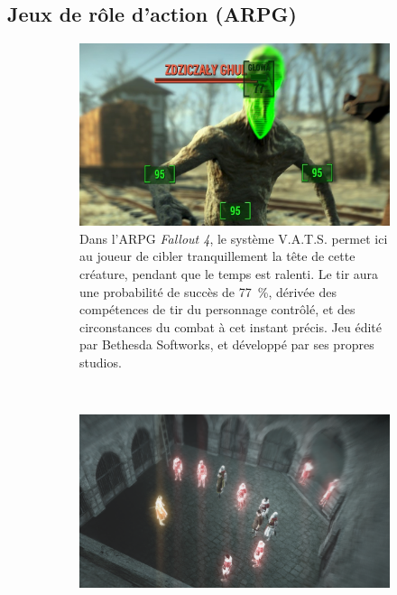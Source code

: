 \begin{appendices}
	
	
	
	\subsection{Jeux de rôle d'action (ARPG)}
	
	\begin{figure}[!htbp]
		\begin{subfigure}[t]{0.48\textwidth}
			\centering
			\includegraphics[width=\textwidth]{figures/ch1/f4vats}
			\caption[Système V.A.T.S permettant de faciliter les tirs dans \emph{Fallout 4}]{Dans l'ARPG \emph{Fallout 4}, le système V.A.T.S. permet ici au joueur de cibler tranquillement la tête de cette créature, pendant que le temps est ralenti. Le tir aura une probabilité de succès de 77~\%{}, dérivée des compétences de tir du personnage contrôlé, et des circonstances du combat à cet instant précis. Jeu édité par Bethesda Softworks, et développé par ses propres studios.}
			\label{fig:f4vats}
		\end{subfigure}
		~
		\begin{subfigure}[t]{0.50\textwidth}
			\centering
			\includegraphics[width=\textwidth]{figures/ch1/assassin}

\end{subfigure}
\end{figure}
\end{appendices}

